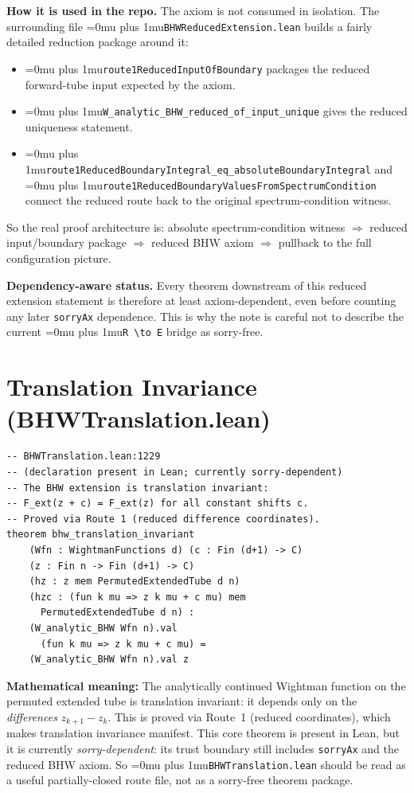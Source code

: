 \documentclass[11pt,a4paper]{article}
\newcommand{\leanfile}[1]{\begingroup\Urlmuskip=0mu plus 1mu\relax\nolinkurl{#1}\endgroup}
\newcommand{\leanname}[1]{\begingroup\Urlmuskip=0mu plus 1mu\relax\nolinkurl{#1}\endgroup}
\begin{document}
\medskip\noindent
\textbf{How it is used in the repo.}
The axiom is not consumed in isolation. The surrounding file
\leanfile{BHWReducedExtension.lean} builds a fairly detailed reduction package
around it:
\begin{itemize}
\item \leanname{route1ReducedInputOfBoundary} packages the reduced forward-tube
  input expected by the axiom.
\item \leanname{W\_analytic\_BHW\_reduced\_of\_input\_unique} gives the reduced
  uniqueness statement.
\item \leanname{route1ReducedBoundaryIntegral\_eq\_absoluteBoundaryIntegral}
  and \leanname{route1ReducedBoundaryValuesFromSpectrumCondition} connect the
  reduced route back to the original spectrum-condition witness.
\end{itemize}

\noindent
So the real proof architecture is: absolute spectrum-condition witness
$\Rightarrow$ reduced input/boundary package $\Rightarrow$ reduced BHW axiom
$\Rightarrow$ pullback to the full configuration picture.

\medskip\noindent
\textbf{Dependency-aware status.}
Every theorem downstream of this reduced extension statement is therefore at
least axiom-dependent, even before counting any later \texttt{sorryAx}
dependence. This is why the note is careful not to describe the current
\leanfile{R \to E} bridge as sorry-free.

\section{Translation Invariance (BHWTranslation.lean)}

\begin{lstlisting}
-- BHWTranslation.lean:1229
-- (declaration present in Lean; currently sorry-dependent)
-- The BHW extension is translation invariant:
-- F_ext(z + c) = F_ext(z) for all constant shifts c.
-- Proved via Route 1 (reduced difference coordinates).
theorem bhw_translation_invariant
    (Wfn : WightmanFunctions d) (c : Fin (d+1) -> C)
    (z : Fin n -> Fin (d+1) -> C)
    (hz : z mem PermutedExtendedTube d n)
    (hzc : (fun k mu => z k mu + c mu) mem
      PermutedExtendedTube d n) :
    (W_analytic_BHW Wfn n).val
      (fun k mu => z k mu + c mu) =
    (W_analytic_BHW Wfn n).val z
\end{lstlisting}

\noindent\textbf{Mathematical meaning:} The analytically continued Wightman
function on the permuted extended tube is translation invariant: it depends
only on the \emph{differences} $z_{k+1} - z_k$. This is proved via
Route~1 (reduced coordinates), which makes translation invariance manifest.
This core theorem is present in Lean, but it is currently
\emph{sorry-dependent}: its trust boundary still includes \texttt{sorryAx} and the
reduced BHW axiom. So \leanfile{BHWTranslation.lean} should be read as a useful
partially-closed route file, not as a sorry-free theorem package.
\end{document}

